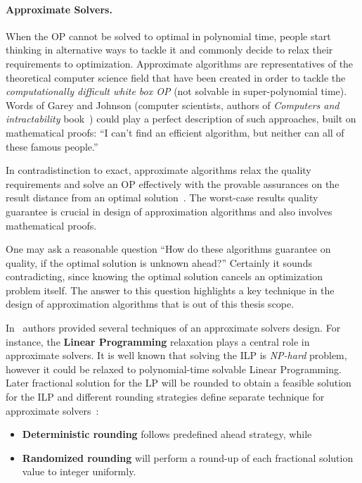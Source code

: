\paragraph{Approximate Solvers.} When the OP cannot be solved to optimal in polynomial time, people start thinking in alternative ways to tackle it and commonly decide to relax their requirements to optimization.
Approximate algorithms are representatives of the theoretical computer science field that have been created in order to tackle the \textit{computationally difficult white box OP} (not solvable in super-polynomial time). Words of Garey and Johnson (computer scientists, authors of \textit{Computers and intractability} book~\cite{garey1979computers}) could play a perfect description of such approaches, built on mathematical proofs: ``I can't find an efficient algorithm, but neither can all of these famous people.''

In contradistinction to exact, approximate algorithms relax the quality requirements and solve an OP effectively with the provable assurances on the result distance from an optimal solution~\cite{williamson2011design}. The worst-case results quality guarantee is crucial in design of approximation algorithms and also involves mathematical proofs. 

One may ask a reasonable question ``How do these algorithms guarantee on quality, if the optimal solution is unknown ahead?'' Certainly it sounds contradicting, since knowing the optimal solution cancels an optimization problem itself. The answer to this question highlights a key technique in the design of approximation algorithms that is out of this thesis scope.

In~\cite{williamson2011design} authors provided several techniques of an approximate solvers design. For instance, the \textbf{Linear Programming} relaxation plays a central role in approximate solvers. It is well known that solving the ILP is \textit{NP-hard} problem, however it could be relaxed to polynomial-time solvable Linear Programming. %
Later fractional solution for the LP will be rounded to obtain a feasible solution for the ILP %
and different rounding strategies define separate technique for approximate solvers~\cite{williamson2011design}: 
\begin{itemize}[itemsep=8pt]
	\item \textbf{Deterministic rounding} follows predefined ahead strategy, while
	\item \textbf{Randomized rounding} will perform a round-up of each fractional solution value to integer uniformly.
\end{itemize}

